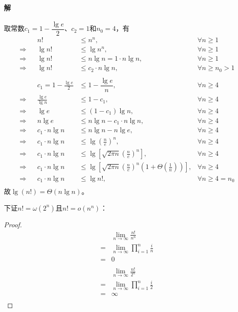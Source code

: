 \documentclass{article}
\begin{document}
\paragraph{解}
取常数$c_1 = 1 - \dfrac{\lg{e}}{2}$、$c_2 = 1$和$n_0 = 4$，有
\begin{align*}
                && n!      &\leq n^n, & \forall n \geq 1 \\
    \Rightarrow && \lg{n!} &\leq \lg{n^n},                    & \forall n \geq 1 \\
    \Rightarrow && \lg{n!} &\leq n \lg{n} = 1 \cdot n \lg{n}, & \forall n \geq 1 \\
    \Rightarrow && \lg{n!} &\leq c_2 \cdot n \lg{n}, & \forall n \geq n_0 > 1 \\
    \\
                && c_1 = 1 - \frac{\lg{e}}{2} &\leq 1 - \dfrac{\lg{e}}{n}, & \forall n \geq 4 \\
    \Rightarrow && \frac{\lg{e}}{\lg{n}} &\leq 1 - c_1, & \forall n \geq 4 \\
    \Rightarrow && \lg{e} &\leq (1-c_1)\lg{n}, & \forall n \geq 4 \\
    \Rightarrow && n\lg{e} &\leq n \lg{n} - c_1 \cdot n\lg{n}, & \forall n \geq 4 \\
    \Rightarrow && c_1 \cdot n \lg{n} &\leq n\lg{n}-n\lg{e}, & \forall n \geq 4 \\
    \Rightarrow && c_1 \cdot n \lg{n} &\leq \lg{\left(\frac{n}{e}\right)^n}, & \forall n \geq 4 \\
    \Rightarrow && c_1 \cdot n \lg{n} &\leq \lg{\left[\sqrt{2 \pi n}\left(\frac{n}{e}\right)^n\right]}, & \forall n \geq 4 \\
    \Rightarrow && c_1 \cdot n \lg{n} &\leq \lg{\left[\sqrt{2 \pi n}\left(\frac{n}{e}\right)^n \left(1+\Theta \left(\frac{1}{n}\right) \right)\right]}, & \forall n \geq 4 \\
    \Rightarrow && c_1 \cdot n \lg{n} &\leq \lg{n!}, &\forall n \geq 4 = n_0 \\
\end{align*}
故$\lg{(n!)}=\Theta(n \lg{n})$。\par
下证$n!=\omega (2^n)$且$n!=o(n^n)$：
\begin{proof}
\begin{align*}
    & \lim_{n \to \infty}{\frac{n!}{n^n}} \\
    =& \lim_{n \to \infty}{\prod_{i=1}^n{\frac{i}{n}}} \\
    =& 0 \\
    \\
    & \lim_{n \to \infty}{\frac{n!}{2^n}} \\
    =& \lim_{n \to \infty}{\prod_{i=1}^n{\frac{i}{2}}} \\
    =& \infty \\
\end{align*}
\end{proof}
\end{document}
